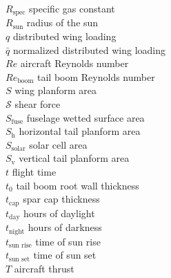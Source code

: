 \begin{tabbing}
$R_{\text{spec}}$ \> specific gas constant \\ %
$R_{\text{sun}}$ \> radius of the sun \\
$q$ \> distributed wing loading \\ %
$\bar{q}$ \> normalized distributed wing loading \\
$Re$ \> aircraft Reynolds number \\
$Re_{\text{boom}}$ \> tail boom Reynolds number \\
$S$ \> wing planform area \\ %
$\mathcal{S}$ \> shear force \\ %
$S_{\text{fuse}}$ \> fuselage wetted surface area \\ %
$S_{\text{h}}$ \> horizontal tail planform area \\ %
$S_{\text{solar}}$ \> solar cell area \\ %
$S_{\text{v}}$ \> vertical tail planform area \\ %
$t$ \> flight time \\ %
$t_0$ \> tail boom root wall thickness \\ %
$t_{\text{cap}}$ \> spar cap thickness \\ %
$t_{\text{day}}$ \> hours of daylight \\ %
$t_{\text{night}}$ \> hours of darkness \\ %
$t_{\text{sun rise}}$ \> time of sun rise \\ %
$t_{\text{sun set}}$ \> time of sun set \\ %
$T$ \> aircraft thrust \\ %

\end{tabbing}
